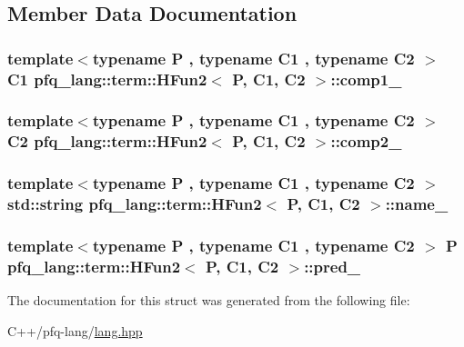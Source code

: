 \subsection{Member Data Documentation}
\hypertarget{structpfq__lang_1_1term_1_1HFun2_a7c395ee57e98d0991b54984ed3da65a8}{
\subsubsection[{comp1\-\_\-}]{\setlength{\rightskip}{0pt plus 5cm}template$<$typename P , typename C1 , typename C2 $>$ C1 {\bf pfq\-\_\-lang\-::term\-::\-H\-Fun2}$<$ P, C1, C2 $>$\-::comp1\-\_\-}}\label{structpfq__lang_1_1term_1_1HFun2_a7c395ee57e98d0991b54984ed3da65a8}
\hypertarget{structpfq__lang_1_1term_1_1HFun2_a9d891e5539b5140e3ba2c4a02c9ac1fb}{
\subsubsection[{comp2\-\_\-}]{\setlength{\rightskip}{0pt plus 5cm}template$<$typename P , typename C1 , typename C2 $>$ C2 {\bf pfq\-\_\-lang\-::term\-::\-H\-Fun2}$<$ P, C1, C2 $>$\-::comp2\-\_\-}}\label{structpfq__lang_1_1term_1_1HFun2_a9d891e5539b5140e3ba2c4a02c9ac1fb}
\hypertarget{structpfq__lang_1_1term_1_1HFun2_aa3808dccb93ad00cfd0be7caa80f30b9}{
\subsubsection[{name\-\_\-}]{\setlength{\rightskip}{0pt plus 5cm}template$<$typename P , typename C1 , typename C2 $>$ std\-::string {\bf pfq\-\_\-lang\-::term\-::\-H\-Fun2}$<$ P, C1, C2 $>$\-::name\-\_\-}}\label{structpfq__lang_1_1term_1_1HFun2_aa3808dccb93ad00cfd0be7caa80f30b9}
\hypertarget{structpfq__lang_1_1term_1_1HFun2_aa33f80727f25efed1112901cbcf1098a}{
\subsubsection[{pred\-\_\-}]{\setlength{\rightskip}{0pt plus 5cm}template$<$typename P , typename C1 , typename C2 $>$ P {\bf pfq\-\_\-lang\-::term\-::\-H\-Fun2}$<$ P, C1, C2 $>$\-::pred\-\_\-}}\label{structpfq__lang_1_1term_1_1HFun2_aa33f80727f25efed1112901cbcf1098a}


The documentation for this struct was generated from the following file\-:\begin{DoxyCompactItemize}
\item 
C++/pfq-\/lang/\hyperlink{lang_8hpp}{lang.\-hpp}\end{DoxyCompactItemize}
